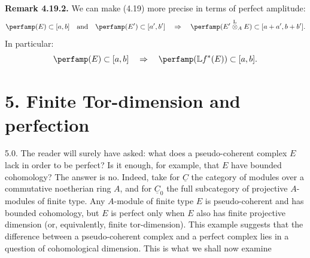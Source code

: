 \textbf{Remark 4.19.2.} We can make (4.19) more precise in terms of perfect amplitude:
\[
  \perfamp(E)\subset[a,b]\quad\text{and}\quad
  \perfamp(E')\subset[a',b']
  \quad\Rightarrow\quad
  \perfamp(E'\overset{\mathrm L}{\otimes}_A E)\subset[a+a',b+b'].
\]
In particular:
\[
  \perfamp(E)\subset[a,b]
  \quad\Rightarrow\quad
  \perfamp(\mathbb L f^*(E))\subset[a,b].
\]

\section*{5. Finite Tor-dimension and perfection}

5.0. The reader will surely have asked: what does a pseudo-coherent complex \(E\) lack in order to be perfect? Is it enough, for example, that \(E\) have bounded cohomology? The answer is no. Indeed, take for \(\underline{C}\) the category of modules over a commutative noetherian ring \(A\), and for \(\underline{C}_0\) the full subcategory of projective \(A\)-modules of finite type. Any \(A\)-module of finite type \(E\) is pseudo-coherent and has bounded cohomology, but \(E\) is perfect only when \(E\) also has finite projective dimension (or, equivalently, finite tor-dimension). This example suggests that the difference between a pseudo-coherent complex and a perfect complex lies in a question of cohomological dimension. This is what we shall now examine
